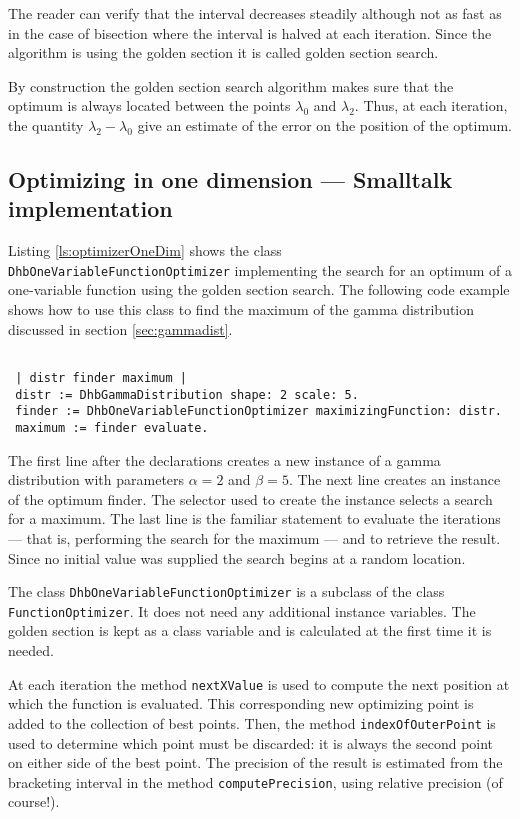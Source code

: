 \documentclass[twoside]{book}
\begin{document}
The reader can verify that the interval decreases steadily
although not as fast as in the case of bisection where the
interval is halved at each iteration. Since the algorithm is using
the golden section it is called golden section search.

By construction the golden section search algorithm makes sure
that the optimum is always located between the points $\lambda_0$
and $\lambda_2$. Thus, at each iteration, the quantity
$\lambda_2-\lambda_0$ give an estimate of the error on the
position of the optimum.

\subsection{Optimizing in one dimension --- Smalltalk implementation}
 Listing
\ref{ls:optimizerOneDim} shows the class {\tt
DhbOneVariableFunctionOptimizer} implementing the search for an
optimum of a one-variable function using the golden section
search. The following code example shows how to use this class to
find the maximum of the gamma distribution discussed in section
\ref{sec:gammadist}.
\begin{codeExample}
\begin{verbatim}

 | distr finder maximum |
 distr := DhbGammaDistribution shape: 2 scale: 5.
 finder := DhbOneVariableFunctionOptimizer maximizingFunction: distr.
 maximum := finder evaluate.
\end{verbatim}
\end{codeExample}
The first line after the declarations creates a new instance of a
gamma distribution with parameters $\alpha = 2$ and $\beta = 5$.
The next line creates an instance of the optimum finder. The
selector used to create the instance selects a search for a
maximum. The last line is the familiar statement to evaluate the
iterations --- that is, performing the search for the maximum ---
and to retrieve the result. Since no initial value was supplied
the search begins at a random location.

The class {\tt DhbOneVariableFunctionOptimizer} is a subclass of
the class {\tt FunctionOptimizer}. It does not need any additional
instance variables. The golden section is kept as a class variable
and is calculated at the first time it is needed.

At each iteration the method {\tt nextXValue} is used to compute
the next position at which the function is evaluated. This
corresponding new optimizing point is added to the collection of
best points. Then, the method {\tt indexOfOuterPoint} is used to
determine which point must be discarded: it is always the second
point on either side of the best point. The precision of the
result is estimated from the bracketing interval in the method
{\tt computePrecision}, using relative precision (of course!).
\end{document}
